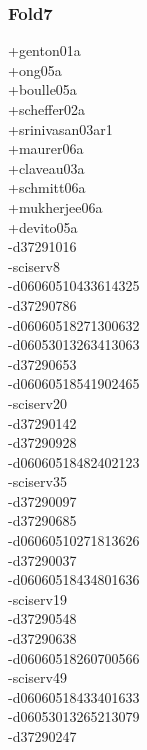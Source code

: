 \begin{multicols}{3}
\subsubsection*{Fold7}
+genton01a\\
+ong05a\\
+boulle05a\\
+scheffer02a\\
+srinivasan03ar1\\
+maurer06a\\
+claveau03a\\
+schmitt06a\\
+mukherjee06a\\
+devito05a\\
-d37291016\\
-sciserv8\\
-d06060510433614325\\
-d37290786\\
-d06060518271300632\\
-d06053013263413063\\
-d37290653\\
-d06060518541902465\\
-sciserv20\\
-d37290142\\
-d37290928\\
-d06060518482402123\\
-sciserv35\\
-d37290097\\
-d37290685\\
-d06060510271813626\\
-d37290037\\
-d06060518434801636\\
-sciserv19\\
-d37290548\\
-d37290638\\
-d06060518260700566\\
-sciserv49\\
-d06060518433401633\\
-d06053013265213079\\
-d37290247\\

\end{multicols}

